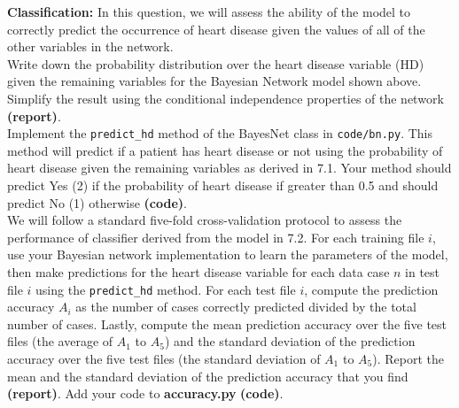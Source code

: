 \documentclass[11pt]{article}
\begin{document}
\begin{problem}{15} \textbf{Classification:} In this question, we will assess the ability of the model to correctly predict the occurrence of heart disease given the values of all of the other variables in the network. \\

 Write down the probability distribution over the heart disease variable (HD) given the remaining variables for the Bayesian Network model shown above. Simplify the result using the conditional independence properties of the network \textbf{(report)}. \\

 Implement the \verb|predict_hd| method of the BayesNet class in \verb|code/bn.py|. This method will predict if a patient has heart disease or not using the probability of heart disease given the remaining variables as derived in 7.1. Your method should predict Yes (2) if the probability of heart disease if greater than 0.5 and should predict No (1) otherwise \textbf{(code)}.\\

  We will follow a standard five-fold cross-validation protocol to assess the performance of classifier derived from the model in 7.2. For each training file $i$, use your Bayesian network implementation to learn the parameters of the model, then make predictions for the heart disease variable for each data case $n$ in test file $i$ using the \verb|predict_hd| method. For each test file $i$, compute the prediction accuracy $A_i$ as the number of cases correctly predicted divided by the total number of cases. Lastly, compute the mean prediction accuracy over the five test files (the average of $A_1$ to $A_5$) and the standard deviation of the prediction accuracy over the five test files (the standard deviation of $A_1$ to $A_5$). Report the mean and the standard deviation of the prediction accuracy that you find \textbf{(report)}. Add your code to \textbf{accuracy.py} \textbf{(code)}.
\end{problem}
\end{document}
